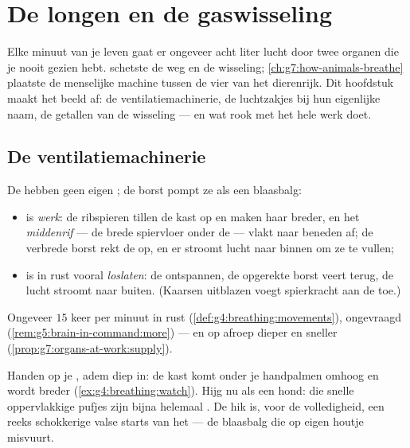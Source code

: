 \chapter{De longen en de gaswisseling}\label{ch:g7:lungs-and-gas-exchange}

Elke minuut van je leven gaat er ongeveer acht liter lucht door twee
organen die je nooit gezien hebt.  schetste de weg
en de wisseling; \cref{ch:g7:how-animals-breathe} plaatste de menselijke
machine tussen de vier van het dierenrijk. Dit hoofdstuk maakt het beeld
af: de ventilatiemachinerie, de luchtzakjes bij hun eigenlijke naam, de
getallen van de wisseling --- en wat rook met het hele werk doet.

\section{De ventilatiemachinerie}

\begin{proposition}\label{prop:g7:lungs-and-gas-exchange:ventilation}
De  hebben geen eigen ; de borst pompt ze als een blaasbalg:
\begin{itemize}
  \item {} is \emph{werk}: de ribspieren tillen de kast op en maken
        haar breder, en het \emph{middenrif} --- de brede
        spiervloer onder de  --- vlakt naar beneden af; de
        verbrede borst rekt de  op, en er stroomt lucht naar
        binnen om ze te vullen;
  \item {} is in rust vooral \emph{loslaten}: de 
        ontspannen, de opgerekte borst veert terug, de lucht stroomt naar
        buiten. (Kaarsen uitblazen voegt spierkracht aan de  toe.)
\end{itemize}
Ongeveer $15$ keer per minuut in rust
(\cref{def:g4:breathing:movements}), ongevraagd
(\cref{rem:g5:brain-in-command:more}) --- en op afroep dieper en sneller
(\cref{prop:g7:organs-at-work:supply}).
\end{proposition}
\admitted

\begin{example}\label{ex:g7:lungs-and-gas-exchange:feel}
Handen op je , adem diep in: de kast komt onder je handpalmen
omhoog en wordt breder (\cref{ex:g4:breathing:watch}). Hijg nu als een
hond: die snelle oppervlakkige pufjes zijn bijna helemaal . De
hik is, voor de volledigheid, een reeks schokkerige valse starts van het
 --- de blaasbalg die op eigen houtje misvuurt.
\end{example}

